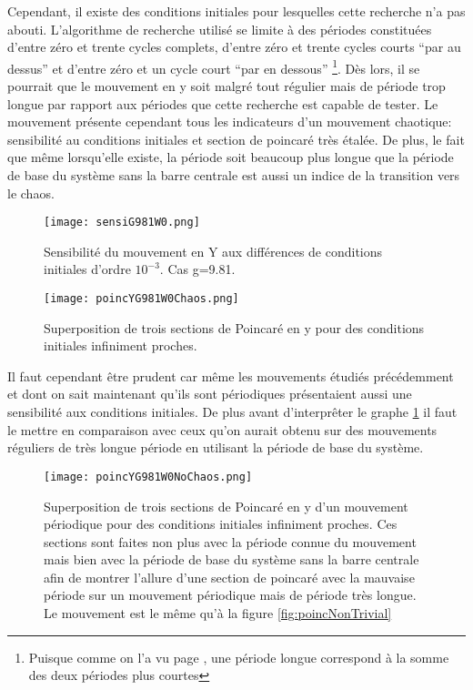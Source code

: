 \documentclass[a4paper]{report}
\begin{document}
Cependant, il existe des conditions initiales pour lesquelles cette recherche n'a pas abouti. L'algorithme de recherche utilisé se limite à des périodes constituées d'entre zéro et trente cycles complets, d'entre zéro et trente cycles courts ``par au dessus'' et d'entre zéro et un cycle court ``par en dessous'' \footnote{Puisque comme on l'a vu page \pageref{propr:sommePeriodes}, une période longue correspond à la somme des deux périodes plus courtes}. Dès lors, il se pourrait que le mouvement en y soit malgré tout régulier mais de période trop longue par rapport aux périodes que cette recherche est capable de tester. Le mouvement présente cependant tous les indicateurs d'un mouvement chaotique: sensibilité au conditions initiales et section de poincaré très étalée. De plus, le fait que même lorsqu'elle existe, la période soit beaucoup plus longue que la période de base du système sans la barre centrale est aussi un indice de la transition vers le chaos.
\begin{figure}[h!]
   \texttt{[image: sensiG981W0.png]}
      \caption[Sensibilité aux conditions initiales: g=9.81 .]{Sensibilité du mouvement en Y aux différences de conditions initiales d'ordre \(10^{-3}\). Cas g=9.81.}
\end{figure}
\begin{figure}[H]
   \texttt{[image: poincYG981W0Chaos.png]}
      \caption[Section de Poincaré en y: g=9.81 ]{Superposition de trois sections de Poincaré en y pour des conditions initiales infiniment proches.\label{fig:poincGChaos}}
\end{figure}
Il faut cependant être prudent car même les mouvements étudiés précédemment et dont on sait maintenant qu'ils sont périodiques présentaient aussi une sensibilité aux conditions initiales. De plus avant d'interprêter le graphe \ref{fig:poincGChaos} il faut le mettre en comparaison avec ceux qu'on aurait obtenu sur des mouvements réguliers de très longue période en utilisant la période de base du système.
\begin{figure}[h!]
   \texttt{[image: poincYG981W0NoChaos.png]}
      \caption[Section de Poincaré en y d'un mouvement périodique: g=9.81 ]{Superposition de trois sections de Poincaré en y d'un mouvement périodique pour des conditions initiales infiniment proches. Ces sections sont faites non plus avec la période connue du mouvement mais bien avec la période de base du système sans la barre centrale afin de montrer l'allure d'une section de poincaré avec la mauvaise période sur un mouvement périodique mais de période très longue. Le mouvement est le même qu'à la figure \ref{fig:poincNonTrivial}}
\end{figure}
\end{document}

